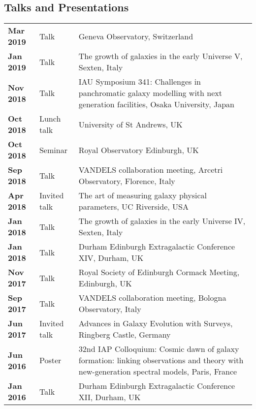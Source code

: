 \documentclass[a4paper,fleqn,usenatbib,onecolumn]{mnras}
\begin{document}
\subsection*{Talks and Presentations}
\begingroup
\setlength{\tabcolsep}{0pt} %
\renewcommand{\arraystretch}{1.4} %
\begin{longtable}{ p{2.5cm} p{2.5cm} p{12cm} }

\bf{Mar 2019} & Talk & Geneva Observatory, Switzerland\\

\bf{Jan 2019} & Talk & The growth of galaxies in the early Universe V, Sexten, Italy\\

\bf{Nov 2018} & Talk & IAU Symposium 341: Challenges in panchromatic galaxy modelling with next generation facilities, Osaka University, Japan\\

\bf{Oct 2018} & Lunch talk & University of St Andrews, UK\\

\bf{Oct 2018} & Seminar & Royal Observatory Edinburgh, UK\\

\bf{Sep 2018} & Talk & VANDELS collaboration meeting, Arcetri Observatory, Florence, Italy\\

\bf{Apr 2018} & Invited talk & The art of measuring galaxy physical parameters, UC Riverside, USA\\

\bf{Jan 2018} & Talk & The growth of galaxies in the early Universe IV, Sexten, Italy\\

\bf{Jan 2018} & Talk & Durham Edinburgh Extragalactic Conference XIV, Durham, UK\\

\bf{Nov 2017} & Talk & Royal Society of Edinburgh Cormack Meeting, Edinburgh, UK\\

\bf{Sep 2017} & Talk & VANDELS collaboration meeting, Bologna Observatory, Italy\\

\bf{Jun 2017} & Invited talk & Advances in Galaxy Evolution with Surveys, Ringberg Castle, Germany\\

\bf{Jun 2016} & Poster & 32nd IAP Colloquium: Cosmic dawn of galaxy formation: linking observations and theory with new-generation spectral models, Paris, France \\

\bf{Jan 2016} & Talk & Durham Edinburgh Extragalactic Conference XII, Durham, UK\\

\end{longtable}
\endgroup
\end{document}
